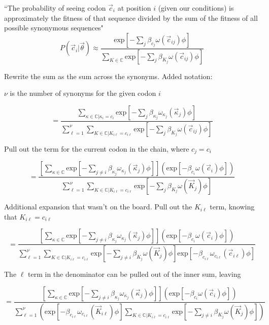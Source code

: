 \documentclass[11pt]{article} %
\begin{document}
``The probability of seeing codon $\vec{c}_i$ at position $i$ (given our conditions) is approximately the fitness of that sequence divided by the sum of the fitness of all possible synonymous sequences"
\[
P(\vec{c}_i | \vec{\theta})
\approx
\frac{
\mbox{exp}\left[-\sum_{j} \beta_{c_j} \omega (\vec{c}_{ij}) \phi \right]
}{
\sum _{K \in \mathbb{C}}
\mbox{exp}\left[-\sum_{j} \beta_{K_j} \omega (\vec{c}_{ij}) \phi \right]
}
\]


Rewrite the sum as the sum across the synonyms.
Added notation: 

$\nu$ is the number of synonyms for the given codon $i$

\[
=
\frac{
\sum _{\kappa \in \mathbb{C} | \kappa_i = c_i}
\mbox{exp}\left[-\sum_{j} \beta_{\kappa_j} \omega_{\kappa_j} (\vec{\kappa}_j) \phi \right]
}{
\sum_{\ell=1}^\nu
\sum _{K \in \mathbb{C} | K_{i\ell} = c_{i\ell}}
\mbox{exp}\left[-\sum_{j} \beta_{K_j} \omega (\vec{c}_{ij}) \phi \right]
}
\]

Pull out the term for the current codon in the chain, where $c_j=c_i$

\[
=
\frac{
\left[
\sum _{\kappa \in \mathbb{C}}
\mbox{exp}\left[-\sum_{j\neq i} \beta_{\kappa_j} \omega_{\kappa_j} (\vec{\kappa}_j) \phi \right]
\right]
\left(\mbox{exp}\left[-\beta_{c_i} \omega (\vec{c}_i) \phi \right]\right)
}{
\sum_{\ell=1}^\nu
\sum _{K \in \mathbb{C} | K_{i\ell} = c_{i\ell}}
\mbox{exp}\left[-\sum_{j} \beta_{K_j} \omega (\vec{K}_j) \phi \right]
}
\]


Additional expansion that wasn't on the board. Pull out the $K_{i\ell}$ term, knowing that $K_{i\ell}=c_{i\ell}$

\[
=
\frac{
\left[
\sum _{\kappa \in \mathbb{C}}
\mbox{exp}\left[-\sum_{j\neq i} \beta_{\kappa_j} \omega_{\kappa_j} (\vec{\kappa}_j) \phi \right]
\right]
\left(\mbox{exp}\left[-\beta_{c_i} \omega (\vec{c}_i) \phi \right]\right)
}{
\sum_{\ell=1}^\nu
\sum _{K \in \mathbb{C} | K_{i\ell} = c_{i\ell}}
\mbox{exp}\left[-\sum_{j\neq i} \beta_{K_j} \omega (\vec{K}_j) \phi \right]
\mbox{exp}\left[-\beta_{c_{i\ell}} \omega_{c_{i\ell}} (\vec{c}_{i\ell}) \phi \right]
}
\]

The $\ell$ term in the denominator can be pulled out of the inner sum, leaving

\[
=
\frac{
\left[
\sum _{\kappa \in \mathbb{C}}
\mbox{exp}\left[-\sum_{j\neq i} \beta_{\kappa_j} \omega_{\kappa_j} (\vec{\kappa}_j) \phi \right]
\right]
\left(\mbox{exp}\left[-\beta_{c_i} \omega (\vec{c}_i) \phi \right]\right)
}{
\sum_{\ell=1}^\nu
\left(
\mbox{exp}\left[-\beta_{c_{i\ell}} \omega_{c_{i\ell}} (\vec{K}_{i\ell}) \phi \right]
\sum _{K \in \mathbb{C} | K_{i\ell} = c_{i\ell}}
\mbox{exp}\left[-\sum_{j\neq i} \beta_{K_j} \omega (\vec{K}_j) \phi \right]
\right)
}
\]
\end{document}
